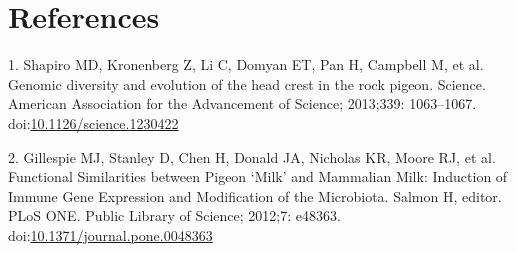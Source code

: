 \documentclass[10pt,letterpaper]{article}
\begin{document}
\hypertarget{references}{%
\section*{References}\label{references}}

\hypertarget{refs}{}
\leavevmode\hypertarget{ref-Shapiro1063}{}%
1. Shapiro MD, Kronenberg Z, Li C, Domyan ET, Pan H, Campbell M, et al.
Genomic diversity and evolution of the head crest in the rock pigeon.
Science. American Association for the Advancement of Science; 2013;339:
1063--1067.
doi:\href{https://doi.org/10.1126/science.1230422}{10.1126/science.1230422}

\leavevmode\hypertarget{ref-Gillespie2012}{}%
2. Gillespie MJ, Stanley D, Chen H, Donald JA, Nicholas KR, Moore RJ, et
al. Functional Similarities between Pigeon `Milk' and Mammalian Milk:
Induction of Immune Gene Expression and Modification of the Microbiota.
Salmon H, editor. PLoS ONE. Public Library of Science; 2012;7: e48363.
doi:\href{https://doi.org/10.1371/journal.pone.0048363}{10.1371/journal.pone.0048363}

\nolinenumbers
\end{document}
